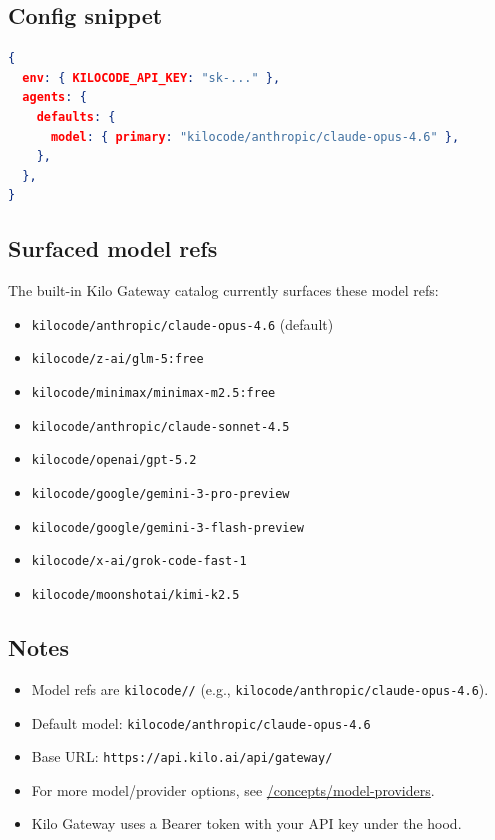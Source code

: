 \subsection{Config snippet}


\begin{lstlisting}[language=json]
{
  env: { KILOCODE_API_KEY: "sk-..." },
  agents: {
    defaults: {
      model: { primary: "kilocode/anthropic/claude-opus-4.6" },
    },
  },
}
\end{lstlisting}


\subsection{Surfaced model refs}


The built-in Kilo Gateway catalog currently surfaces these model refs:

\begin{itemize}
  \item \texttt{kilocode/anthropic/claude-opus-4.6} (default)
  \item \texttt{kilocode/z-ai/glm-5:free}
  \item \texttt{kilocode/minimax/minimax-m2.5:free}
  \item \texttt{kilocode/anthropic/claude-sonnet-4.5}
  \item \texttt{kilocode/openai/gpt-5.2}
  \item \texttt{kilocode/google/gemini-3-pro-preview}
  \item \texttt{kilocode/google/gemini-3-flash-preview}
  \item \texttt{kilocode/x-ai/grok-code-fast-1}
  \item \texttt{kilocode/moonshotai/kimi-k2.5}
\end{itemize}


\subsection{Notes}


\begin{itemize}
  \item Model refs are \texttt{kilocode//} (e.g., \texttt{kilocode/anthropic/claude-opus-4.6}).
  \item Default model: \texttt{kilocode/anthropic/claude-opus-4.6}
  \item Base URL: \texttt{https://api.kilo.ai/api/gateway/}
  \item For more model/provider options, see \href{/concepts/model-providers}{/concepts/model-providers}.
  \item Kilo Gateway uses a Bearer token with your API key under the hood.
\end{itemize}



